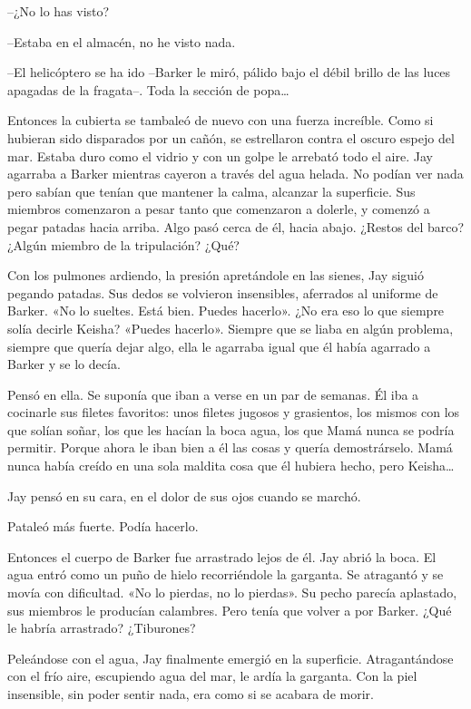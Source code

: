 {--¿No lo has visto?}

{--Estaba en el almacén, no he visto nada.}

{--El helicóptero se ha ido --Barker le miró, pálido bajo el débil
 brillo de las luces apagadas de la fragata--. Toda la sección de
 popa\ldots{}}

{Entonces la cubierta se tambaleó de nuevo con una fuerza increíble.
 Como si hubieran sido disparados por un cañón, se estrellaron contra el
 oscuro espejo del mar. Estaba duro como el vidrio y con un golpe le
 arrebató todo el aire. Jay agarraba a Barker mientras cayeron a través
 del agua helada. No podían ver nada pero sabían que tenían que mantener
 la calma, alcanzar la superficie. Sus miembros comenzaron a pesar tanto
 que comenzaron a dolerle, y comenzó a pegar patadas hacia arriba. Algo
 pasó cerca de él, hacia abajo. ¿Restos del barco? ¿Algún miembro de la
tripulación? ¿Qué?}

{Con los pulmones ardiendo, la presión apretándole en las sienes, Jay
 siguió pegando patadas. Sus dedos se volvieron insensibles, aferrados al
 uniforme de Barker. «No lo sueltes. Está bien. Puedes hacerlo». ¿No era
 eso lo que siempre solía decirle Keisha? «Puedes hacerlo». Siempre que
 se liaba en algún problema, siempre que quería dejar algo, ella le
agarraba igual que él había agarrado a Barker y se lo decía.}

{Pensó en ella. Se suponía que iban a verse en un par de semanas. Él iba
 a cocinarle sus filetes favoritos: unos filetes jugosos y grasientos,
 los mismos con los que solían soñar, los que les hacían la boca agua,
 los que Mamá nunca se podría permitir. Porque ahora le iban bien a él
 las cosas y quería demostrárselo. Mamá nunca había creído en una sola
 maldita cosa que él hubiera hecho, pero Keisha\ldots{}}

{Jay pensó en su cara, en el dolor de sus ojos cuando se marchó.}

{Pataleó más fuerte. Podía hacerlo.}

{Entonces el cuerpo de Barker fue arrastrado lejos de él. Jay abrió la
 boca. El agua entró como un puño de hielo recorriéndole la garganta. Se
 atragantó y se movía con dificultad. «No lo pierdas, no lo pierdas». Su
 pecho parecía aplastado, sus miembros le producían calambres. Pero tenía
que volver a por Barker. ¿Qué le habría arrastrado? ¿Tiburones?}

{Peleándose con el agua, Jay finalmente emergió en la superficie.
 Atragantándose con el frío aire, escupiendo agua del mar, le ardía la
 garganta. Con la piel insensible, sin poder sentir nada, era como si se
acabara de morir.}

